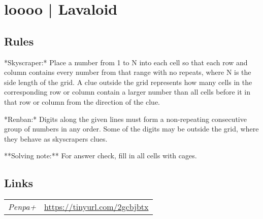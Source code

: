 \section{loooo | {\normalfont Lavaloid}}
\label{sec:18-loooo-lavaloid}

\subsection*{Rules}
\begin{markdown}
*Skyscraper:* Place a number from 1 to N into each cell so that each row and column contains every number from that range with no repeats, where N is the side length of the grid. A clue outside the grid represents how many cells in the corresponding row or column contain a larger number than all cells before it in that row or column from the direction of the clue.



*Renban:* Digits along the given lines must form a non-repeating consecutive group of numbers in any order. Some of the digits may be outside the grid, where they behave as skyscrapers clues.



**Solving note:** For answer check, fill in all cells with cages.
\end{markdown}
\subsection*{Links}
\begin{tabularx}{\textwidth}{l X}
\emph{Penpa+} & \url{https://tinyurl.com/2gcbjbtx} \\
\end{tabularx}
\pagebreak
